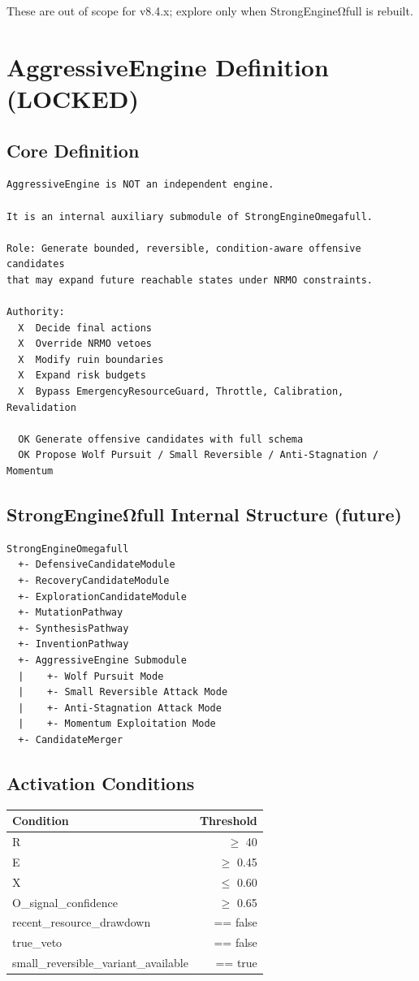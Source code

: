 \documentclass[11pt,a4paper]{article}
\begin{document}
These are out of scope for v8.4.x; explore only when StrongEngineΩfull is rebuilt.

\section{AggressiveEngine Definition (LOCKED)}

\subsection{Core Definition}

\begin{verbatim}
AggressiveEngine is NOT an independent engine.

It is an internal auxiliary submodule of StrongEngineOmegafull.

Role: Generate bounded, reversible, condition-aware offensive candidates
that may expand future reachable states under NRMO constraints.

Authority:
  X  Decide final actions
  X  Override NRMO vetoes
  X  Modify ruin boundaries
  X  Expand risk budgets
  X  Bypass EmergencyResourceGuard, Throttle, Calibration, Revalidation

  OK Generate offensive candidates with full schema
  OK Propose Wolf Pursuit / Small Reversible / Anti-Stagnation / Momentum
\end{verbatim}

\subsection{StrongEngineΩfull Internal Structure (future)}

\begin{verbatim}
StrongEngineOmegafull
  +- DefensiveCandidateModule
  +- RecoveryCandidateModule
  +- ExplorationCandidateModule
  +- MutationPathway
  +- SynthesisPathway
  +- InventionPathway
  +- AggressiveEngine Submodule
  |    +- Wolf Pursuit Mode
  |    +- Small Reversible Attack Mode
  |    +- Anti-Stagnation Attack Mode
  |    +- Momentum Exploitation Mode
  +- CandidateMerger
\end{verbatim}

\subsection{Activation Conditions}

\begin{tabular}{lr}
\toprule
\textbf{Condition} & \textbf{Threshold} \\
\midrule
R & $\geq$ 40 \\
E & $\geq$ 0.45 \\
X & $\leq$ 0.60 \\
O\_signal\_confidence & $\geq$ 0.65 \\
recent\_resource\_drawdown & == false \\
true\_veto & == false \\
small\_reversible\_variant\_available & == true \\
\bottomrule
\end{tabular}
\end{document}
